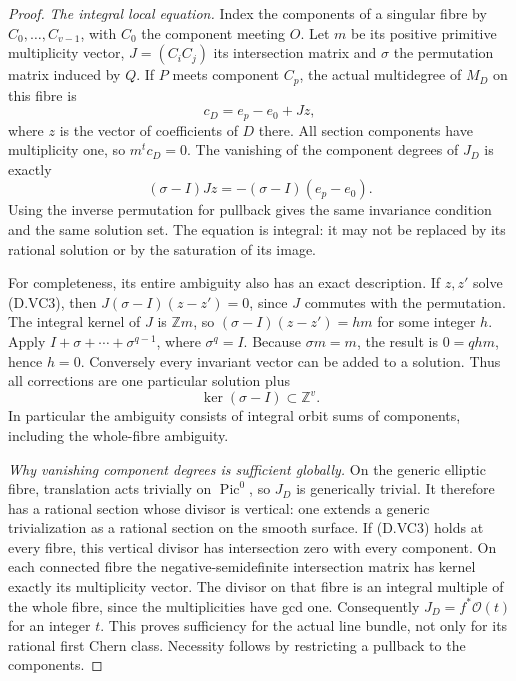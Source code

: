 \begin{proof}

\emph{The integral local equation.}
Index the components of a singular fibre by $C_0,\ldots,C_{v-1}$,
with $C_0$ the component meeting $O$. Let $m$ be its positive
primitive multiplicity vector, $J=(C_iC_j)$ its intersection
matrix and $\sigma$ the permutation matrix induced by $Q$.
If $P$ meets component $C_p$, the actual multidegree of
$M_D$ on this fibre is
\[
                    c_D=e_p-e_0+Jz,
                                                        \tag{D.VC2}
\]
where $z$ is the vector of coefficients of $D$ there.
All section components have multiplicity one, so $m^tc_D=0$.
The vanishing of the component degrees of $J_D$ is exactly
\[
                 (\sigma-I)Jz=-(\sigma-I)(e_p-e_0).
                                                        \tag{D.VC3}
\]
Using the inverse permutation for pullback gives the same
invariance condition and the same solution set.
The equation is integral: it may not be replaced by its
rational solution or by the saturation of its image.

For completeness, its entire ambiguity also has an exact
description. If $z,z'$ solve (D.VC3), then
$J(\sigma-I)(z-z')=0$, since $J$ commutes with the permutation.
The integral kernel of $J$ is $\mathbb Zm$, so
$(\sigma-I)(z-z')=h m$ for some integer $h$.
Apply $I+\sigma+\cdots+\sigma^{q-1}$, where $\sigma^q=I$.
Because $\sigma m=m$, the result is $0=qh m$, hence $h=0$.
Conversely every invariant vector can be added to a solution.
Thus all corrections are one particular solution plus
\[
                         \ker(\sigma-I)\subset\mathbb Z^v.
                                                        \tag{D.VC4}
\]
In particular the ambiguity consists of integral orbit sums
of components, including the whole-fibre ambiguity.

\emph{Why vanishing component degrees is sufficient globally.}
On the generic elliptic fibre, translation acts trivially
on $\operatorname{Pic}^0$, so $J_D$ is generically trivial.
It therefore has a rational section whose divisor is vertical:
one extends a generic trivialization as a rational section
on the smooth surface. If (D.VC3) holds at every fibre,
this vertical divisor has intersection zero with every
component. On each connected fibre the negative-semidefinite
intersection matrix has kernel exactly its multiplicity
vector. The divisor on that fibre is an integral multiple
of the whole fibre, since the multiplicities have gcd one.
Consequently $J_D=f^*\mathcal O(t)$ for an integer $t$.
This proves sufficiency for the actual line bundle, not
only for its rational first Chern class. Necessity follows
by restricting a pullback to the components.


\end{proof}

